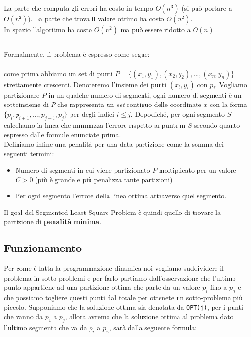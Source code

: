 La parte che computa gli errori ha costo in tempo $O(n^3)$ (si può portare a
$O(n^2)$).
La parte che trova il valore ottimo ha costo $O(n^2)$.\\

In spazio l'algoritmo ha costo $O(n^2)$ ma può essere ridotto a $O(n)$

\subsection{\goal}

Formalmente, il problema è espresso come segue:

\paragraph*{} come prima abbiamo un set di punti $P = \{(x_1, y_1), (x_2, y_2),
    \ldots, (x_n, y_n)\}$ strettamente crescenti. Denoteremo l'insieme dei punti
$(x_i, y_i)$ con $p_i$. Vogliamo partizionare $P$ in un qualche numero di
segmenti, ogni numero di segmenti è un sottoinsieme di $P$ che rappresenta un
\textit{set} contiguo delle coordinate $x$ con la forma $\{p_i, p_{i+1}, \ldots,
    p_{j-1}, p_j\}$ per degli indici $i \leq j$. Dopodiché, per ogni segmento $S$
calcoliamo la linea che minimizza l'errore rispetto ai punti in $S$ secondo
quanto espresso dalle formule enunciate prima.\\

Definiamo infine una penalità per una data partizione come la somma dei seguenti
termini:

\begin{itemize}
    \item Numero di segmenti in cui viene partizionato $P$ moltiplicato per un
          valore $C > 0$ (più è grande e più penalizza tante partizioni)
    \item Per ogni segmento l'errore della linea ottima attraverso quel
          segmento.
\end{itemize}


Il goal del Segmented Least Square Problem è quindi quello di trovare la
partizione di \textbf{penalità minima}.

\subsection{Funzionamento}

Per come è fatta la programmazione dinamica noi vogliamo suddividere il problema
in sotto-problemi e per farlo partiamo dall'osservazione che l'ultimo punto
appartiene ad una partizione ottima che parte da un valore $p_i$ fino a $p_n$ e
che possiamo togliere questi punti dal totale per ottenete un sotto-problema più
piccolo. Supponiamo che la soluzione ottima sia denotata da \verb|OPT(j)|, per i
punti che vanno da $p_1$ a $p_j$, allora avremo che la soluzione ottima al
problema dato l'ultimo segmento che va da $p_i$ a $p_n$, sarà dalla seguente
formula:

